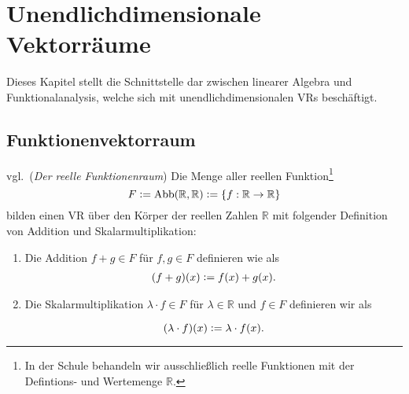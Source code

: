 \chapter{Unendlichdimensionale Vektorräume}
\label{sec:unendliche VRs}
Dieses Kapitel stellt die Schnittstelle dar zwischen linearer Algebra und Funktionalanalysis, welche sich mit unendlichdimensionalen \aclp{VR} beschäftigt. 
\section{Funktionenvektorraum}

\begin{Satz} vgl.\,\cite[S. 28 f., 6.2]{Skript} (\emph{Der reelle Funktionenraum}) \label{funktionenraum}Die Menge aller reellen Funktion\footnote{In der Schule behandeln wir ausschließlich reelle Funktionen mit der Defintions- und Wertemenge $\mathbb{R}$.}
\[F \vcentcolon=  \operatorname{Abb}(\mathbb{R}, \mathbb{R})\vcentcolon= \{f : \mathbb{R} \rightarrow\mathbb{R}\}\]
bilden einen \acl{VR} über den Körper der reellen Zahlen $\mathbb{R}$ mit folgender Definition von Addition und Skalarmultiplikation:
\begin{enumerate}
	\item Die Addition $f+g\in F$ für $f,g \in F$ definieren wie als
	\begin{align*} (f+g)(x) \vcentcolon= f(x)+ g(x)\text{.}
	\end{align*}
	
	\item Die Skalarmultiplikation $\lambda \cdot f \in F$ für $\lambda \in \mathbb{R}$ und $f \in F$ definieren wir als 
	
	\[(\lambda \cdot f)(x) \vcentcolon= \lambda \cdot f (x)\text{.}\]		
\end{enumerate}
\end{Satz}

